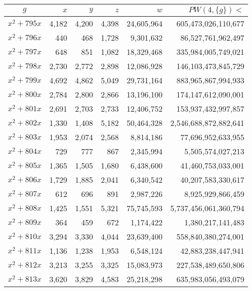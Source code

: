 \documentclass{article}
\begin{document}
\begin{center}
\begin{tabular}{ | c | r | r | r | r | r | }
$g$ & $x$ & $y$ & $z$ & $w$ & $PW(4, \{g\}) <$ \\ \hline
$x^2 + 795x$ & 4{,}182 & 4{,}200 & 4{,}398 & 24{,}605{,}964 & 605{,}473{,}026{,}110{,}677 \\ \hline
$x^2 + 796x$ & 440 & 468 & 1{,}728 & 9{,}301{,}632 & 86{,}527{,}761{,}962{,}497 \\ \hline
$x^2 + 797x$ & 648 & 851 & 1{,}082 & 18{,}329{,}468 & 335{,}984{,}005{,}749{,}021 \\ \hline
$x^2 + 798x$ & 2{,}730 & 2{,}772 & 2{,}898 & 12{,}086{,}928 & 146{,}103{,}473{,}845{,}729 \\ \hline
$x^2 + 799x$ & 4{,}692 & 4{,}862 & 5{,}049 & 29{,}731{,}164 & 883{,}965{,}867{,}994{,}933 \\ \hline
$x^2 + 800x$ & 2{,}784 & 2{,}800 & 2{,}866 & 13{,}196{,}100 & 174{,}147{,}612{,}090{,}001 \\ \hline
$x^2 + 801x$ & 2{,}691 & 2{,}703 & 2{,}733 & 12{,}406{,}752 & 153{,}937{,}432{,}997{,}857 \\ \hline
$x^2 + 802x$ & 1{,}330 & 1{,}408 & 5{,}182 & 50{,}464{,}328 & 2{,}546{,}688{,}872{,}882{,}641 \\ \hline
$x^2 + 803x$ & 1{,}953 & 2{,}074 & 2{,}568 & 8{,}814{,}186 & 77{,}696{,}952{,}633{,}955 \\ \hline
$x^2 + 804x$ & 729 & 777 & 867 & 2{,}345{,}994 & 5{,}505{,}574{,}027{,}213 \\ \hline
$x^2 + 805x$ & 1{,}365 & 1{,}505 & 1{,}680 & 6{,}438{,}600 & 41{,}460{,}753{,}033{,}001 \\ \hline
$x^2 + 806x$ & 1{,}729 & 1{,}885 & 2{,}041 & 6{,}340{,}542 & 40{,}207{,}583{,}330{,}617 \\ \hline
$x^2 + 807x$ & 612 & 696 & 891 & 2{,}987{,}226 & 8{,}925{,}929{,}866{,}459 \\ \hline
$x^2 + 808x$ & 1{,}425 & 1{,}551 & 5{,}321 & 75{,}745{,}593 & 5{,}737{,}456{,}061{,}360{,}794 \\ \hline
$x^2 + 809x$ & 364 & 459 & 672 & 1{,}174{,}422 & 1{,}380{,}217{,}141{,}483 \\ \hline
$x^2 + 810x$ & 3{,}294 & 3{,}330 & 4{,}044 & 23{,}639{,}400 & 558{,}840{,}380{,}274{,}001 \\ \hline
$x^2 + 811x$ & 1{,}136 & 1{,}238 & 1{,}953 & 6{,}548{,}124 & 42{,}883{,}238{,}447{,}941 \\ \hline
$x^2 + 812x$ & 3{,}213 & 3{,}255 & 3{,}325 & 15{,}083{,}973 & 227{,}538{,}489{,}650{,}806 \\ \hline
$x^2 + 813x$ & 3{,}620 & 3{,}829 & 4{,}583 & 25{,}218{,}298 & 635{,}983{,}056{,}493{,}079 \\ \hline

\end{tabular}
\end{center}
\end{document}
